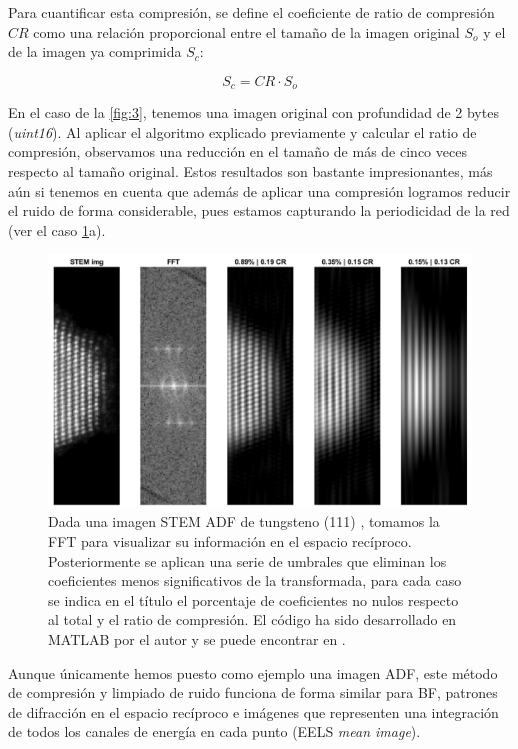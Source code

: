 Para cuantificar esta compresión, se define el coeficiente de ratio de compresión $CR$ como una relación proporcional entre el tamaño de la imagen original $S_o$ y el de la imagen ya comprimida $S_c$:

\begin{equation} \label{cr}
   S_c = CR \cdot S_o 
\end{equation}

En el caso de la \autoref{fig:3}, tenemos una imagen original con profundidad de 2 bytes (\textit{uint16}). Al aplicar el algoritmo explicado previamente y calcular el ratio de compresión, observamos una reducción en el tamaño de más de cinco veces respecto al tamaño original. Estos resultados son bastante impresionantes, más aún si tenemos en cuenta que además de aplicar una compresión logramos reducir el ruido de forma considerable, pues estamos capturando la periodicidad de la red (ver el caso \ref{fig:3}a).

\begin{figure}[h!]
    \centering
    \includegraphics[width=1\textwidth]{fig/Fig3.png}
    \caption{Dada una imagen STEM ADF de tungsteno (111) \cite{datos}, tomamos la FFT para visualizar su información en el espacio recíproco. Posteriormente se aplican una serie de umbrales que eliminan los coeficientes menos significativos de la transformada, para cada caso se indica en el título el porcentaje de coeficientes no nulos respecto al total y el ratio de compresión. El código ha sido desarrollado en MATLAB por el autor y se puede encontrar en \cite{repo}. }
    \label{fig:3}
\end{figure}

Aunque únicamente hemos puesto como ejemplo una imagen ADF, este método de compresión y limpiado de ruido funciona de forma similar para BF, patrones de difracción en el espacio recíproco e imágenes que representen una integración de todos los canales de energía en cada punto (EELS \textit{mean image}).

